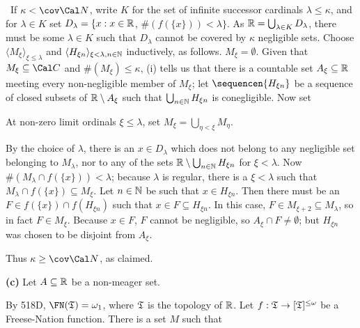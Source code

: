 {\medskip

 \Quer\ If $\kappa<\cov\Cal N$, write $K$ for the set of
infinite successor cardinals $\lambda\le\kappa$, and for
$\lambda\in K$ set
$D_{\lambda}=\{x:x\in\Bbb R$, $\#(f(\{x\}))<\lambda\}$.   As
$\Bbb R=\bigcup_{\lambda\in K}D_{\lambda}$, there must be
some $\lambda\in K$ such that $D_{\lambda}$ cannot be covered
by $\kappa$ negligible sets.   Choose
$\langle M_{\xi}\rangle_{\xi\le\lambda}$ and
$\langle H_{\xi n}\rangle_{\xi<\lambda,n\in\Bbb N}$ inductively, as
follows.   $M_{\xi}=\emptyset$.   Given that $M_{\xi}\subseteq\Cal C$
and $\#(M_{\xi})\le\kappa$, (i)
tells us that there is a countable set $A_{\xi}\subseteq\Bbb R$
meeting every non-negligible member of $M_{\xi}$;  let
$\sequencen{H_{\xi n}}$ be a sequence of closed subsets of
$\Bbb R\setminus A_{\xi}$ such that $\bigcup_{n\in\Bbb N}H_{\xi n}$ is
conegligible.   Now set


\noindent At non-zero limit ordinals $\xi\le\lambda$, set
$M_{\xi}=\bigcup_{\eta<\xi}M_{\eta}$.

By the choice of $\lambda$, there is an $x\in D_{\lambda}$ which does not
belong to any negligible set belonging to $M_{\lambda}$,
nor to any of the sets
$\Bbb R\setminus\bigcup_{n\in\Bbb N}H_{\xi n}$ for $\xi<\lambda$.   Now
$\#(M_{\lambda}\cap f(\{x\}))<\lambda$;  because $\lambda$ is regular,
there is a $\xi<\lambda$ such that
$M_{\lambda}\cap f(\{x\})\subseteq M_{\xi}$.
Let $n\in\Bbb N$ be such that $x\in H_{\xi n}$.   Then there must be an
$F\in f(\{x\})\cap f(H_{\xi n})$ such that $x\in F\subseteq H_{\xi n}$.
In this case, $F\in M_{\xi+2}\subseteq M_{\lambda}$, so in fact
$F\in M_{\xi}$.   Because $x\in F$, $F$ cannot be negligible, so
$A_{\xi}\cap F\ne\emptyset$;  but $H_{\xi n}$ was chosen to be disjoint
from $A_{\xi}$.\ \Bang

\medskip

 Thus $\kappa\ge\cov\Cal N$, as claimed.
\medskip

{\bf (c)} Let $A\subseteq\Bbb R$ be a non-meager set.

\medskip

 By 518D, $\FN(\frak T)=\omega_1$, where $\frak T$ is the
topology of $\Bbb R$.   Let $f:\frak T\to[\frak T]^{\le\omega}$ be a
Freese-Nation function.   There is a set $M$ such that

}
